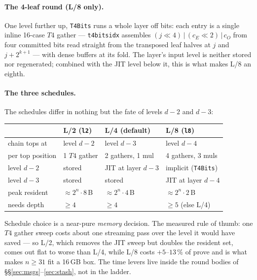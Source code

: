 \documentclass[11pt]{article}
\newcommand{\code}[1]{{\def\_{\textunderscore\allowbreak}\texttt{#1}}}
\theoremstyle{definition}
\begin{document}
\paragraph{The 4-leaf round (L/8 only).}
One level further up, \code{T4Bits} runs a whole layer off bits:
each entry is a single inline 16-case $T4$ gather ---
\code{t4bits\_idx} assembles $(j{\ll}4) \,|\, (c_E{\ll}2) \,|\, c_O$
from four committed bits read straight from the transposed leaf
halves at $j$ and $j + 2^{k+1}$ --- with dense buffers at its fold.
The layer's input level is neither stored nor regenerated; combined
with the JIT level below it, this is what makes L/8 an eighth.

\paragraph{The three schedules.}
The schedules differ in nothing but the fate of levels $d{-}2$ and
$d{-}3$:

\begin{center}
\small
\begin{tabular}{llll}
\toprule
 & L/2 (\code{l2}) & L/4 (default) & L/8 (\code{l8}) \\
\midrule
chain tops at & level $d{-}2$ & level $d{-}3$ & level $d{-}4$ \\
per top position & 1 $T4$ gather & 2 gathers, 1 mul & 4 gathers, 3 muls \\
level $d{-}2$ & stored & JIT at layer $d{-}3$ & implicit (\code{T4Bits}) \\
level $d{-}3$ & stored & stored & JIT at layer $d{-}4$ \\
peak resident & ${\approx}2^n{\cdot}8$\,B & ${\approx}2^n{\cdot}4$\,B &
  ${\approx}2^n{\cdot}2$\,B \\
needs depth & $\ge 4$ & $\ge 4$ & $\ge 5$ (else L/4) \\
\bottomrule
\end{tabular}
\end{center}

Schedule choice is a near-pure \emph{memory} decision.  The measured
rule of thumb: one $T4$ gather sweep costs about one streaming pass
over the level it would have saved --- so L/2, which removes the JIT
sweep but doubles the resident set, comes out flat to worse than L/4,
while L/8 costs $+5$--$13\,\%$ of prove and is what makes $n \ge 31$
fit a 16\,GB box.  The time levers live inside the round bodies of
\S\S\ref{sec:msgs}--\ref{sec:stash}, not in the ladder.
\end{document}
